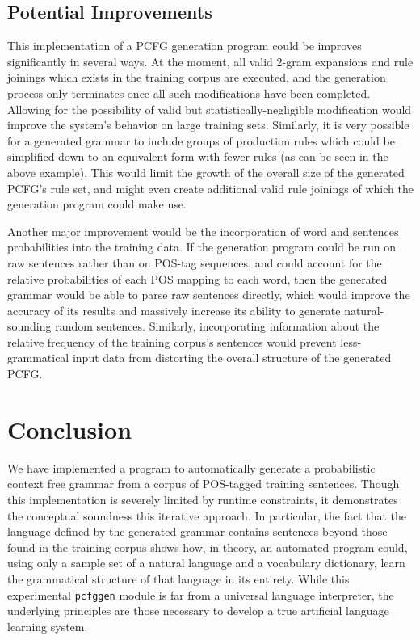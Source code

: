 \documentclass[paper=a4, fontsize=11pt]{scrartcl} %
\numberwithin{equation}{section} %
\numberwithin{figure}{section} %
\numberwithin{table}{section} %
\begin{document}
\subsection{Potential Improvements}

This implementation of a PCFG generation program could be improves significantly in several ways. At the moment, all valid 2-gram expansions and rule joinings which exists in the training corpus are executed, and the generation process only terminates once all such modifications have been completed. Allowing for the possibility of valid but statistically-negligible modification would improve the system's behavior on large training sets. Similarly, it is very possible for a generated grammar to include groups of production rules which could be simplified down to an equivalent form with fewer rules (as can be seen in the above example). This would limit the growth of the overall size of the generated PCFG's rule set, and might even create additional valid rule joinings of which the generation program could make use.

Another major improvement would be the incorporation of word and sentences probabilities into the training data. If the generation program could be run on raw sentences rather than on POS-tag sequences, and could account for the relative probabilities of each POS mapping to each word, then the generated grammar would be able to parse raw sentences directly, which would improve the accuracy of its results and massively increase its ability to generate natural-sounding random sentences. Similarly, incorporating information about the relative frequency of the training corpus's sentences would prevent less-grammatical input data from distorting the overall structure of the generated PCFG.

\section{Conclusion}

We have implemented a program to automatically generate a probabilistic context free grammar from a corpus of POS-tagged training sentences. Though this implementation is severely limited by runtime constraints, it demonstrates the conceptual soundness this iterative approach. In particular, the fact that the language defined by the generated grammar contains sentences beyond those found in the training corpus shows how, in theory, an automated program could, using only a sample set of a natural language and a vocabulary dictionary, learn the grammatical structure of that language in its entirety. While this experimental \texttt{pcfggen} module is far from a universal language interpreter, the underlying principles are those necessary to develop a true artificial language learning system.
\end{document}
